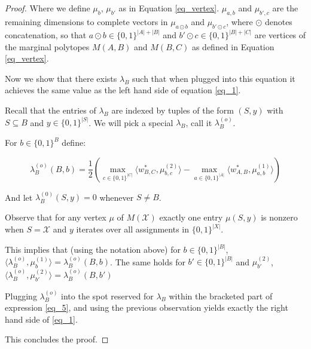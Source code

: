 \begin{proof}
Where we define $\mu_b$, $\mu_{b'}$ as in Equation \ref{eq_vertex}. $\mu_{a,b}$ and $\mu_{b',c}$ are the remaining dimensions to complete vectors in $\mu_{a \odot b }$ and $\mu_{ b' \odot c}$, where $\odot$ denotes concatenation, so that $a \odot b \in \{0,1\}^{|A|+|B|}$ and $b' \odot c \in \{0,1\}^{|B|+|C|}$ are vertices of the marginal polytopes $M(A,B)$ and $M(B,C)$ as defined in Equation \ref{eq_vertex}.

Now we show that there exists $\lambda_B$ such that when plugged into this equation it achieves the same value as the left hand side of equation \ref{eq_1}.

Recall that the entries of $\lambda_B$ are indexed by tuples of the form $(S, y)$ with $S \subseteq B$ and $y \in \{0,1\}^{|S|}$. We will pick a special $\lambda_B$, call it $\lambda_B^{(o)}$.

For $b \in \{0,1\}^{B}$ define:

\begin{equation}
\lambda_B^{(o)}(B, b) = \frac{1}{2}\left( \max_{c \in \{0,1\}^{|C|}} \langle w_{B,C}^*, \mu^{(2)}_{b,c}   \rangle - \max_{a \in \{0,1\}^{|A|}} \langle w_{A,B}^*, \mu^{(1)}_{a,b} \rangle \right) 
\end{equation}

And let $\lambda_B^{(0)}(S,y) = 0$ whenever $S \neq B$. 

Observe that for any vertex $\mu$ of $M(\mathcal{X})$ exactly one entry $\mu(S, y) $ is nonzero when $S = \mathcal{X}$ and $y$ iterates over all assignments in $\{0,1\}^{|X|}$. 

This implies that (using the notation above) for $b \in \{0,1\}^{|B|}$, $\langle \lambda_B^{(o)}, \mu_b^{(1)} \rangle = \lambda_B^{(o)}(B,b)$. The same holds for $b' \in \{0,1\}^{|B|}$ and $\mu_{b'}^{(2)}$,  $\langle \lambda_B^{(o)}, \mu_{b'}^{(2)} \rangle = \lambda_B^{(o)}(B,b')$

Plugging $\lambda_B^{(o)}$ into the spot reserved for $\lambda_B$ within the bracketed part of expression \ref{eq_5}, and using the previous observation yields exactly the right hand side of \ref{eq_1}. 

This concludes the proof. 

\end{proof}

